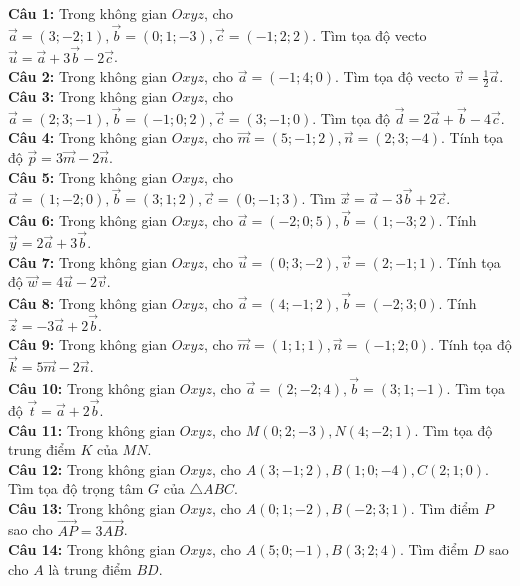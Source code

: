\documentclass[12pt]{article}
\begin{document}
	\begin{btvang}
		\noindent \textbf{Câu 1:} Trong không gian $Oxyz$, cho $\vec{a} = (3; -2; 1), \vec{b} = (0; 1; -3), \vec{c} = (-1; 2; 2)$. Tìm tọa độ vecto $\vec{u} = \vec{a} + 3\vec{b} - 2\vec{c}$. \\
		\noindent \textbf{Câu 2:} Trong không gian $Oxyz$, cho $\vec{a} = (-1; 4; 0)$. Tìm tọa độ vecto $\vec{v} = \frac{1}{2}\vec{a}$. \\
		\noindent \textbf{Câu 3:} Trong không gian $Oxyz$, cho $\vec{a} = (2; 3; -1), \vec{b} = (-1; 0; 2), \vec{c} = (3; -1; 0)$. Tìm tọa độ $\vec{d} = 2\vec{a} + \vec{b} - 4\vec{c}$. \\
		\noindent \textbf{Câu 4:} Trong không gian $Oxyz$, cho $\vec{m} = (5; -1; 2), \vec{n} = (2; 3; -4)$. Tính tọa độ $\vec{p} = 3\vec{m} - 2\vec{n}$. \\
		\noindent \textbf{Câu 5:} Trong không gian $Oxyz$, cho $\vec{a} = (1; -2; 0), \vec{b} = (3; 1; 2), \vec{c} = (0; -1; 3)$. Tìm $\vec{x} = \vec{a} - 3\vec{b} + 2\vec{c}$. \\
		\noindent \textbf{Câu 6:} Trong không gian $Oxyz$, cho $\vec{a} = (-2; 0; 5), \vec{b} = (1; -3; 2)$. Tính $\vec{y} = 2\vec{a} + 3\vec{b}$. \\
		\noindent \textbf{Câu 7:} Trong không gian $Oxyz$, cho $\vec{u} = (0; 3; -2), \vec{v} = (2; -1; 1)$. Tính tọa độ $\vec{w} = 4\vec{u} - 2\vec{v}$. \\
		\noindent \textbf{Câu 8:} Trong không gian $Oxyz$, cho $\vec{a} = (4; -1; 2), \vec{b} = (-2; 3; 0)$. Tính $\vec{z} = -3\vec{a} + 2\vec{b}$. \\
		\noindent \textbf{Câu 9:} Trong không gian $Oxyz$, cho $\vec{m} = (1; 1; 1), \vec{n} = (-1; 2; 0)$. Tính tọa độ $\vec{k} = 5\vec{m} - 2\vec{n}$. \\
		\noindent \textbf{Câu 10:} Trong không gian $Oxyz$, cho $\vec{a} = (2; -2; 4), \vec{b} = (3; 1; -1)$. Tìm tọa độ $\vec{t} = \vec{a} + 2\vec{b}$. \\
		\noindent \textbf{Câu 11:} Trong không gian $Oxyz$, cho $M(0; 2; -3), N(4; -2; 1)$. Tìm tọa độ trung điểm $K$ của $MN$. \\
		\noindent \textbf{Câu 12:} Trong không gian $Oxyz$, cho $A(3; -1; 2), B(1; 0; -4), C(2; 1; 0)$. Tìm tọa độ trọng tâm $G$ của $\triangle ABC$. \\
		\noindent \textbf{Câu 13:} Trong không gian $Oxyz$, cho $A(0; 1; -2), B(-2; 3; 1)$. Tìm điểm $P$ sao cho $\vec{AP} = 3\vec{AB}$. \\
		\noindent \textbf{Câu 14:} Trong không gian $Oxyz$, cho $A(5; 0; -1), B(3; 2; 4)$. Tìm điểm $D$ sao cho $A$ là trung điểm $BD$. \\

\end{btvang}
\end{document}

